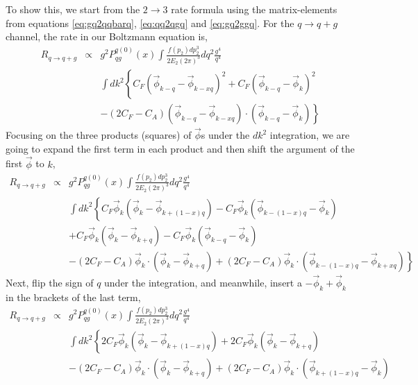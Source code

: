 \begin{appendices}
To show this, we start from the $2\rightarrow 3$ rate formula using the matrix-elements from equations \ref{eq:gq2qqbarq}, \ref{eq:qq2qgq} and \ref{eq:gq2ggq}. 
For the $q\rightarrow q+g$ channel, the rate in our Boltzmann equation is,
\begin{eqnarray}
R_{q\rightarrow q+g} &\propto& g^2 P_{qg}^{q(0)}(x) \int  \frac{f(p_2)dp_2^3}{2E_2(2\pi)^3} d q^2 \frac{g^4}{q^4}\\\nonumber
&&  \int d k^2\left\{
C_F\left( \vec{\phi}_{k-q}-\vec{\phi}_{k-xq} \right)^2
+ C_F\left( \vec{\phi}_{k-q}-\vec{\phi}_{k} \right)^2\right.\\\nonumber
&&\left.
- (2C_F-C_A)\left( \vec{\phi}_{k-q}-\vec{\phi}_{k-xq} \right)\cdot \left( \vec{\phi}_{k-q}-\vec{\phi}_{k} \right)
\right\}
\end{eqnarray}
Focusing on the three products (squares) of $\vec{\phi}$s under the $dk^2$ integration, we are going to expand the first term in each product and then shift the argument of the first $\vec{\phi}$ to $k$, 
\begin{eqnarray}
R_{q\rightarrow q+g} &\propto& g^2 P_{qg}^{q(0)}(x) \int  \frac{f(p_2)dp_2^3}{2E_2(2\pi)^3} d q^2 \frac{g^4}{q^4}\\\nonumber
&&  \int d k^2\left\{
C_F\vec{\phi}_{k}\left( \vec{\phi}_{k}-\vec{\phi}_{k+(1-x)q} \right)
- C_F\vec{\phi}_{k}\left( \vec{\phi}_{k-(1-x)q}-\vec{\phi}_{k} \right)\right.
\\\nonumber
&&+ C_F\vec{\phi}_{k}\left( \vec{\phi}_{k}-\vec{\phi}_{k+q} \right)
- C_F\vec{\phi}_{k}\left( \vec{\phi}_{k-q}-\vec{\phi}_{k} \right)
\\\nonumber
&&\left.
- (2C_F-C_A)\vec{\phi}_{k}\cdot \left( \vec{\phi}_{k}-\vec{\phi}_{k+q} \right)
+(2C_F-C_A)\vec{\phi}_{k} \cdot \left( \vec{\phi}_{k-(1-x)q}-\vec{\phi}_{k+xq} \right)
\right\}
\end{eqnarray}
Next, flip  the sign of $q$ under the integration,
and meanwhile, insert a $-\vec{\phi}_k +\vec{\phi}_k$ in the brackets of the last term,
\begin{eqnarray}
R_{q\rightarrow q+g} &\propto& g^2 P_{qg}^{q(0)}(x) \int  \frac{f(p_2)dp_2^3}{2E_2(2\pi)^3} d q^2 \frac{g^4}{q^4}\\\nonumber
&&  \int d k^2\left\{
2C_F\vec{\phi}_{k}\left( \vec{\phi}_{k}-\vec{\phi}_{k+(1-x)q} \right)
+ 2C_F\vec{\phi}_{k}\left( \vec{\phi}_{k}-\vec{\phi}_{k+q} \right)
\right.
\\\nonumber
&&
- (2C_F-C_A)\vec{\phi}_{k}\cdot \left( \vec{\phi}_{k}-\vec{\phi}_{k+q} \right)
+(2C_F-C_A)\vec{\phi}_{k} \cdot \left( \vec{\phi}_{k+(1-x)q} -\vec{\phi}_k \right) \\\nonumber

\end{eqnarray}
\end{appendices}
